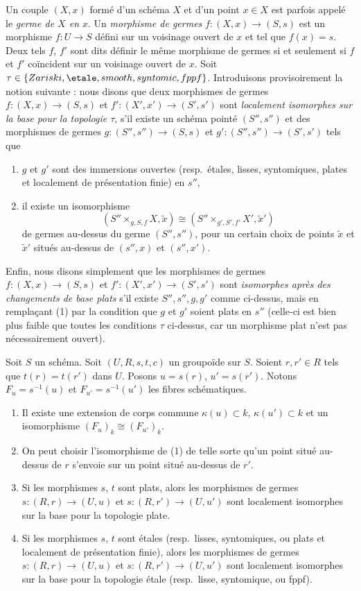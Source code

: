 \medskip\noindent
Un couple $(X, x)$ formé d'un schéma $X$ et d'un point $x \in X$ est parfois
appelé le {\it germe de $X$ en $x$}.
Un {\it morphisme de germes} $f : (X, x) \to (S, s)$
est un morphisme $f : U \to S$ défini sur un voisinage ouvert
de $x$ et tel que $f(x) = s$. Deux tels
$f$, $f'$ sont dits définir le même morphisme de germes
si et seulement si $f$ et $f'$ coïncident sur un voisinage ouvert de $x$.
Soit $\tau \in \{Zariski, \etale, smooth, syntomic, fppf\}$.
Introduisons provisoirement la notion suivante : nous disons que deux morphismes
de germes $f : (X, x) \to (S, s)$ et $f' : (X', x') \to (S', s')$
sont {\it localement isomorphes sur la base pour la topologie $\tau$},
s'il existe un schéma pointé $(S'', s'')$ et des morphismes de germes
$g : (S'', s'') \to (S, s)$ et $g' : (S'', s'') \to (S', s')$
tels que
\begin{enumerate}
\item $g$ et $g'$ sont des immersions ouvertes (resp.\ \'etales, lisses, syntomiques,
plates et localement de présentation finie) en $s''$,
\item il existe un isomorphisme
$$
(S'' \times_{g, S, f} X, \tilde x)
\cong
(S'' \times_{g', S', f'} X', \tilde  x')
$$
de germes au-dessus du germe $(S'', s'')$, pour un certain choix de points
$\tilde x$ et $\tilde x'$ situés au-dessus de $(s'', x)$ et $(s'', x')$.
\end{enumerate}
Enfin, nous disons simplement que les morphismes de germes
$f : (X, x) \to (S, s)$ et $f' : (X', x') \to (S', s')$
sont {\it isomorphes après des changements de base plats} s'il existe
$S'', s'', g, g'$ comme ci-dessus, mais en remplaçant (1) par
la condition que $g$ et $g'$ soient plats en $s''$ (celle-ci est
bien plus faible que toutes les conditions $\tau$ ci-dessus,
car un morphisme plat n'est pas nécessairement ouvert).

\begin{lemma}
\label{lemma-two-fibres}
Soit $S$ un schéma.
Soit $(U, R, s, t, c)$ un groupoïde sur $S$.
Soient $r, r' \in R$ tels que $t(r) = t(r')$ dans $U$.
Posons $u = s(r)$, $u' = s(r')$.
Notons $F_u = s^{-1}(u)$ et $F_{u'} = s^{-1}(u')$ les fibres
schématiques.
\begin{enumerate}
\item Il existe une extension de corps commune
$\kappa(u) \subset k$, $\kappa(u') \subset k$ et
un isomorphisme $(F_u)_k \cong (F_{u'})_k$.
\item On peut choisir l'isomorphisme de (1) de telle sorte qu'un point
situé au-dessus de $r$ s'envoie sur un point situé au-dessus de $r'$.
\item Si les morphismes $s$, $t$ sont plats, alors les morphismes de germes
$s : (R, r) \to (U, u)$ et $s : (R, r') \to (U, u')$ sont
localement isomorphes sur la base pour la topologie plate.
\item Si les morphismes $s$, $t$ sont \'etales
(resp.\ lisses, syntomiques, ou plats et localement de présentation finie),
alors les morphismes de germes $s : (R, r) \to (U, u)$ et
$s : (R, r') \to (U, u')$ sont localement isomorphes sur la base
pour la topologie \'etale (resp.\ lisse, syntomique, ou fppf).
\end{enumerate}
\end{lemma}

